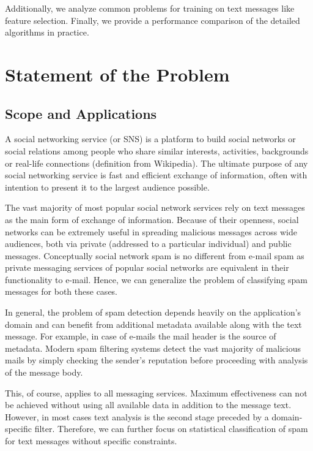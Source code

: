 \documentclass[12pt]{report}
\begin{document}
Additionally, we analyze common problems for training on text messages like feature selection. Finally, we provide a performance comparison of the detailed algorithms in practice.

\newpage


\chapter{Statement of the Problem}

\section{Scope and Applications}

A social networking service (or SNS) is a platform to build social networks or social relations among people who share similar interests, activities, backgrounds or real-life connections (definition from Wikipedia). The ultimate purpose of any social networking service is fast and efficient exchange of information, often with intention to present it to the largest audience possible.

The vast majority of most popular social network services rely on text messages as the main form of exchange of information. Because of their openness, social networks can be extremely useful in spreading malicious messages across wide audiences, both via private (addressed to a particular individual) and public messages. Conceptually social network spam is no different from e-mail spam as private messaging services of popular social networks are equivalent in their functionality to e-mail. Hence, we can generalize the problem of classifying spam messages for both these cases.

In general, the problem of spam detection depends heavily on the application's domain and can benefit from additional metadata available along with the text message. For example, in case of e-mails the mail header is the source of metadata. Modern spam filtering systems detect the vast majority of malicious mails by simply checking the sender's reputation before proceeding with analysis of the message body.

This, of course, applies to all messaging services. Maximum effectiveness can not be achieved without using all available data in addition to the message text. However, in most cases text analysis is the second stage preceded by a domain-specific filter. Therefore, we can further focus on statistical classification of spam for text messages without specific constraints.
\end{document}
